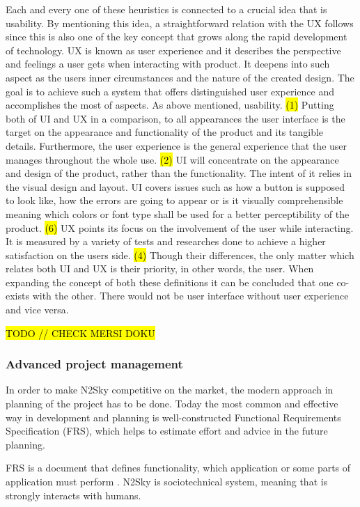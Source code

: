 Each and every one of these heuristics is connected to a crucial idea that is usability. By mentioning this idea, a straightforward relation with the UX follows since this is also one of the key concept that grows along the rapid development of technology. UX is known as user experience and it describes the perspective and feelings a user gets when interacting with product. It deepens into such aspect as the users inner circumstances and the nature of the created design. The goal is to achieve such a system that offers distinguished user experience and accomplishes the most of aspects. As above mentioned, usability.  \hl{(1)}
Putting both of UI and UX in a comparison, to all appearances the user interface is the target on the appearance and functionality of the product and its tangible details.  Furthermore, the user experience is the general experience that the user manages throughout the whole use.   \hl{(2)}
UI will concentrate on the appearance and design of the product, rather than the functionality. The intent of it relies in the visual design and layout. UI covers issues such as how a button is supposed to look like, how the errors are going to appear or is it visually comprehensible meaning which colors or font type shall be used for a better perceptibility of the product.  \hl{(6)}
UX points its focus on the involvement of the user while interacting. It is measured by a variety of tests and researches done to achieve a higher satisfaction on the users side.  \hl{(4)}
Though their differences, the only matter which relates both UI and UX is their priority, in other words, the user. When expanding the concept of both these definitions it can be concluded that one co-exists with the other. There would not be user interface without user experience and vice versa. 

 \hl{TODO // CHECK MERSI DOKU}

\subsubsection{Advanced project management}\label{Advanced project management}

In order to make N2Sky competitive on the market, the modern approach in planning of the project has to be done. Today the most common and effective way in development and planning is well-constructed Functional Requirements Specification (FRS), which helps to estimate effort and advice in the future planning. 

FRS is a document that defines functionality, which application or some parts of application must perform \cite{wiki:frs}. N2Sky is sociotechnical system, meaning that is strongly interacts with humans. 

